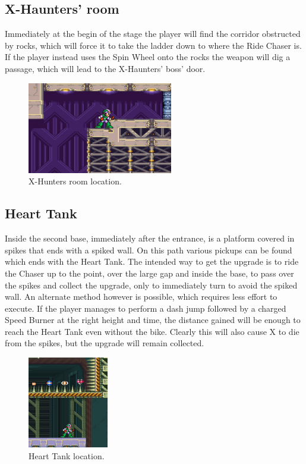 \subsection{X-Haunters' room}
Immediately at the begin of the stage the player will find the corridor obstructed by rocks, which will force it to take the ladder down to where the Ride Chaser is. If the player instead uses the Spin Wheel onto the rocks the weapon will dig a passage, which will lead to the X-Haunters' boss' door.

\begin{figure}[htp]
	\centering
	\includegraphics[height=4cm]{figures/X2/Overdrive_ostrich/Ostrich_haunter_room.png}
	\caption{X-Hunters room location.}
\end{figure}

\subsection{Heart Tank}
Inside the second base, immediately after the entrance, is a platform covered in spikes that ends with a spiked wall. On this path various pickups can be found which ends with the Heart Tank. The intended way to get the upgrade is to ride the Chaser up to the point, over the large gap and inside the base, to pass over the spikes and collect the upgrade, only to immediately turn to avoid the spiked wall. An alternate method however is possible, which requires less effort to execute. If the player manages to perform a dash jump followed by a charged Speed Burner at the right height and time, the distance gained will be enough to reach the Heart Tank even without the bike. Clearly this will also cause X to die from the spikes, but the upgrade will remain collected.
\begin{figure}[htp]
	\centering
	\includegraphics[height=4cm]{figures/X2/Overdrive_ostrich/Ostrich_heart.png}
	\caption{Heart Tank location.}
\end{figure}

